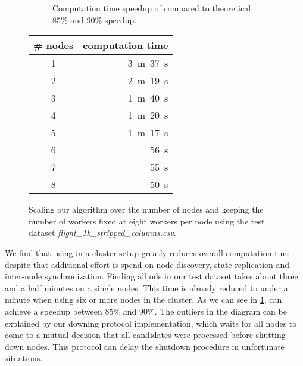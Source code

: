   \begin{figure}[htbp]
    \centering
    \begin{subfigure}[c]{0.6\textwidth}
      \centering
      
      \caption{Computation time speedup of \dodo{} compared to theoretical $85 \%$ and $90 \%$ speedup.}
      \label{fig:fig:node-scaling}
    \end{subfigure}
    \begin{subtable}[c]{0.39\textwidth}
      \centering
      \begin{tabular}{cr}
        \toprule
        \textbf{\# nodes} & \textbf{computation time} \\
        \midrule
        1 & 3~m~37~s \\
        2 & 2~m~19~s \\
        3 & 1~m~40~s \\
        4 & 1~m~20~s \\
        5 & 1~m~17~s \\
        6 & 56~s \\
        7 & 55~s \\
        8 & 50~s \\
        \bottomrule
      \end{tabular}
      \caption{Computation time for finding all \glspl{od} in the dataset of different cluster sizes.}
      \label{fig:tab:node-scaling}
    \end{subtable}
    \caption{Scaling our algorithm over the number of nodes and keeping the number of workers fixed at eight workers per node using the test dataset \textit{flight\_1k\_stripped\_columns.csv}.}
    \label{fig:node-scaling}
  \end{figure}

  We find that using \dodo{} in a cluster setup greatly reduces overall computation time despite that additional effort is spend on node discovery, state replication and inter-node synchronization.
  Finding all \glspl{od} in our test dataset takes about three and a half minutes on a single nodes.
  This time is already reduced to under a minute when using six or more nodes in the \dodo{} cluster.
  As we can see in \cref{fig:fig:node-scaling}, \dodo{} can achieve a speedup between $85 \%$ and $90 \%$.
  The outliers in the diagram can be explained by our downing protocol implementation, which waits for all nodes to come to a mutual decision that all candidates were processed before shutting down nodes.
  This protocol can delay the shutdown procedure in unfortunate situations.
